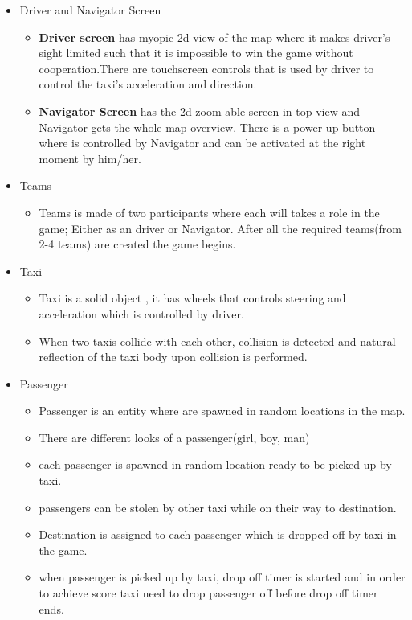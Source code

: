 \begin{itemize}
	\item Driver and Navigator Screen
	\begin{itemize}
		\item \textbf{Driver screen} has myopic 2d view of the map where it makes driver's sight limited such that it is impossible to win the game without cooperation.There are touchscreen controls that is used by driver to control the taxi's acceleration and direction.   
		\item \textbf{Navigator Screen} has the 2d zoom-able screen in top view and Navigator gets the whole map overview. There is a power-up button where is controlled by Navigator and can be activated at the right moment by him/her.
	\end{itemize}
	\item Teams 
	\begin{itemize}
		\item  Teams is made of two participants where each will takes a role in the game; Either as an driver or Navigator. After all the required teams(from 2-4 teams) are created the game begins.
	\end{itemize}	
	\item Taxi
	\begin{itemize}
		\item Taxi is a solid object , it has wheels that controls steering and acceleration which is controlled by driver.
		\item When two taxis collide with each other, collision is detected and natural reflection of the taxi body upon collision is performed.  
	\end{itemize}	
	\item Passenger
	\begin{itemize}
		\item Passenger is an entity where are spawned in random locations in the map.
		\item There are different looks of a passenger(girl, boy, man) 
		\item each passenger is spawned in random location ready to be picked up by taxi.
		\item passengers can be stolen by other taxi while on their way to destination.
		\item Destination is assigned to each passenger which is dropped off by taxi in the game.
		\item when passenger is picked up by taxi, drop off timer is started and in order to achieve score taxi need to drop passenger off before drop off timer ends.

\end{itemize}
\end{itemize}
